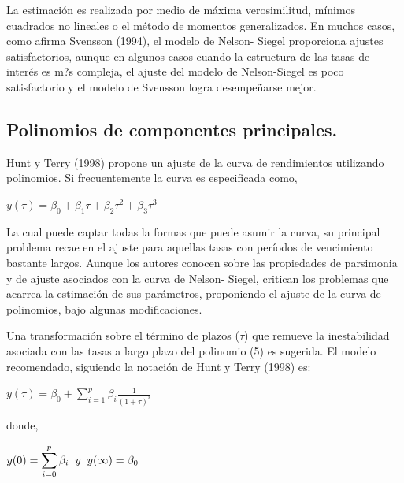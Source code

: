 \hspace*{0.4 cm} La estimaci\'on es realizada por medio de m\'axima verosimilitud, m\'inimos
cuadrados no lineales o el m\'etodo de momentos generalizados. En
muchos casos, como afirma Svensson (1994), el modelo de Nelson-
Siegel proporciona ajustes satisfactorios, aunque en algunos casos
cuando la estructura de las tasas de inter\'es es m?s compleja, el ajuste del
modelo de Nelson-Siegel es poco satisfactorio y el modelo de Svensson
logra desempe\~narse mejor.


\subsection{Polinomios de componentes principales.\\}


\hspace*{0.4 cm} Hunt y Terry (1998) propone un ajuste de la curva de rendimientos
utilizando polinomios. Si frecuentemente la curva es especificada como,

\begin{center}
$\displaystyle{y(\tau) = \beta_{0} + \beta_{1}\tau +\beta_{2}\tau^2 +\beta_{3}\tau^3}$
\end{center}


\hspace*{0.4 cm} La cual puede captar todas la formas que puede asumir la curva, su
principal problema recae en el ajuste para aquellas tasas con per\'iodos de
vencimiento bastante largos. Aunque los autores conocen sobre las
propiedades de parsimonia y de ajuste asociados con la curva de Nelson-
Siegel, critican los problemas que acarrea la estimaci\'on de sus
par\'ametros, proponiendo el ajuste de la curva de polinomios, bajo
algunas modificaciones.

\hspace*{0.4 cm} Una transformaci\'on sobre el t\'ermino de plazos ($\tau$) que remueve la
inestabilidad asociada con las tasas a largo plazo del polinomio (5) es
sugerida. El modelo recomendado, siguiendo la notaci\'on de Hunt y
Terry (1998) es:

\begin{center}
$\displaystyle{y(\tau) = \beta_{0} + \sum_{i=1}^{p} \beta_{i} \frac{1}{(1+\tau)^i}} $
\end{center} 

\noindent donde,

\begin{center}
$\displaystyle{y(0) = \sum_{i=0}^{p}\beta_{i} \hspace*{0.2 cm} y \hspace*{0.2 cm} y(\infty) = \beta_{0}   }$
\end{center} 


